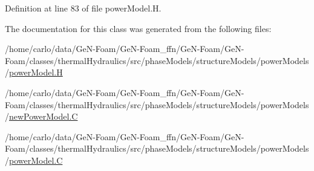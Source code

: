 Definition at line 83 of file power\+Model.\+H.



The documentation for this class was generated from the following files\+:\begin{DoxyCompactItemize}
\item 
/home/carlo/data/\+Ge\+N-\/\+Foam/\+Ge\+N-\/\+Foam\+\_\+ffn/\+Ge\+N-\/\+Foam/\+Ge\+N-\/\+Foam/classes/thermal\+Hydraulics/src/phase\+Models/structure\+Models/power\+Models/\hyperlink{powerModel_8H}{power\+Model.\+H}\item 
/home/carlo/data/\+Ge\+N-\/\+Foam/\+Ge\+N-\/\+Foam\+\_\+ffn/\+Ge\+N-\/\+Foam/\+Ge\+N-\/\+Foam/classes/thermal\+Hydraulics/src/phase\+Models/structure\+Models/power\+Models/\hyperlink{newPowerModel_8C}{new\+Power\+Model.\+C}\item 
/home/carlo/data/\+Ge\+N-\/\+Foam/\+Ge\+N-\/\+Foam\+\_\+ffn/\+Ge\+N-\/\+Foam/\+Ge\+N-\/\+Foam/classes/thermal\+Hydraulics/src/phase\+Models/structure\+Models/power\+Models/\hyperlink{powerModel_8C}{power\+Model.\+C}\end{DoxyCompactItemize}
